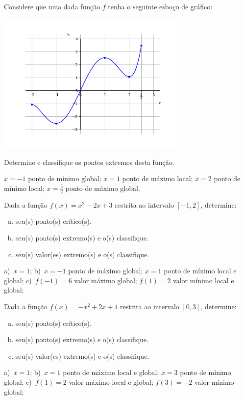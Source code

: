 \begin{exer}
  Considere que uma dada função $f$ tenha o seguinte esboço de gráfico:

  \begin{center}
    \includegraphics[width=0.7\textwidth]{./cap_apderiv/dados/fig_exer_extfun/fig_exer_extfun}
  \end{center}

  Determine e classifique os pontos extremos desta função.
\end{exer}
\begin{resp}
  $x=-1$ ponto de mínimo global; $x=1$ ponto de máximo local; $x=2$ ponto de mínimo local; $x=\frac{5}{2}$ ponto de máximo global.
\end{resp}

\begin{exer}
  Dada a função $f(x)=x^2-2x+3$ restrita ao intervalo $[-1,2]$, determine:
  \begin{enumerate}[a)]
  \item seu(s) ponto(s) crítico(s).
  \item seu(s) ponto(s) extremo(s) e o(s) classifique.
  \item seu(s) valor(es) extremo(s) e o(s) classifique.
  \end{enumerate}
\end{exer}
\begin{resp}
  a)~$x=1$; b)~$x=-1$ ponto de máximo global; $x=1$ ponto de mínimo local e global; c)~$f(-1)=6$ valor máximo global; $f(1)=2$ valor mínimo local e global;
\end{resp}

\begin{exer}
  Dada a função $f(x)=-x^2+2x+1$ restrita ao intervalo $[0,3]$, determine:
  \begin{enumerate}[a)]
  \item seu(s) ponto(s) crítico(s).
  \item seu(s) ponto(s) extremo(s) e o(s) classifique.
  \item seu(s) valor(es) extremo(s) e o(s) classifique.
  \end{enumerate}
\end{exer}
\begin{resp}
  a)~$x=1$; b)~$x=1$ ponto de máximo local e global; $x=3$ ponto de mínimo global; c)~$f(1)=2$ valor máximo local e global; $f(3)=-2$ valor mínimo global;
\end{resp}

